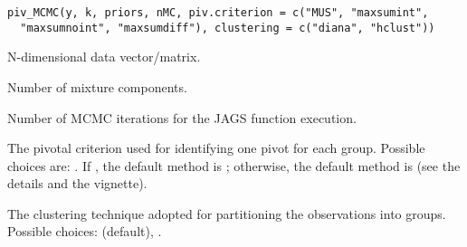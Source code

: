 \documentclass[a4paper]{book}
\begin{document}
%
\begin{Usage}
\begin{verbatim}
piv_MCMC(y, k, priors, nMC, piv.criterion = c("MUS", "maxsumint",
  "maxsumnoint", "maxsumdiff"), clustering = c("diana", "hclust"))
\end{verbatim}
\end{Usage}
%
\begin{Arguments}
\begin{ldescription}
\item[\code{y}] N-dimensional data vector/matrix.

\item[\code{k}] Number of mixture components.

\item[\code{nMC}] Number of MCMC iterations for the JAGS function execution.

\item[\code{piv.criterion}] The pivotal criterion used for identifying one pivot
for each group. Possible choices are: .
If , the default method is ;
otherwise, the default method is  (see the details and
the vignette).

\item[\code{clustering}] The clustering technique adopted for partitioning the
 observations into  groups. Possible choices:  (default),
.
\end{ldescription}
\end{Arguments}
%
\end{document}

